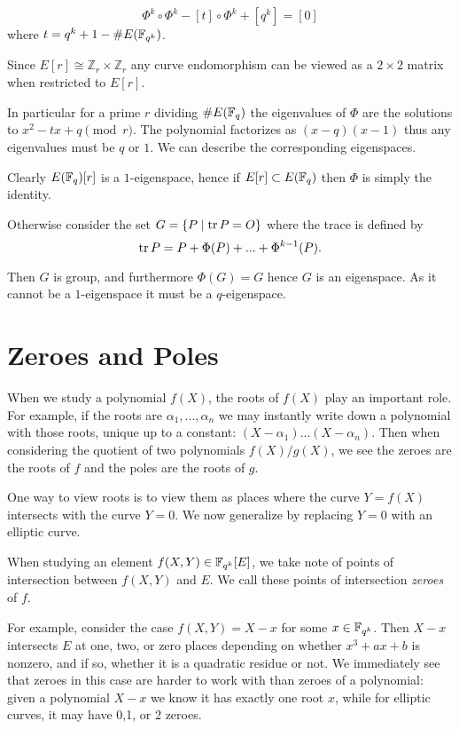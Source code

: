 \begin{theorem}
[Hasse]
\[ \Phi^k \circ \Phi^k - [t] \circ \Phi^k + [q^k] = [0] \]
where $t = q^k + 1 - \#E(\mathbb{F}_{q^k})$.
\end{theorem}

Since $E[r] \cong \mathbb{Z}_r \times \mathbb{Z}_r$ any curve endomorphism
can be viewed as a $2\times 2$ matrix when restricted to $E[r]$.

In particular for a prime $r$ dividing $\#E(\mathbb{F}_q)$ the eigenvalues
of $\Phi$ are the solutions to $x^2 - t x + q \pmod{r}$.
The polynomial factorizes as $(x - q)(x - 1)$ thus any eigenvalues
must be $q$ or $1$. We can describe the corresponding eigenspaces.

Clearly $E(\mathbb{F}_q)[r]$ is a $1$-eigenspace, hence if $E[r] \subset E(\mathbb{F}_q)$
then $\Phi$ is simply the identity.

Otherwise consider the set $G = \{P \mid \mathop{\rm tr} P = O \}$
where the trace is defined by
\[ \mathop{\rm tr} P = P + \Phi(P) + ... + \Phi^{k-1}(P)  .\]

Then $G$ is group, and furthermore $\Phi(G) = G$ hence $G$ is an eigenspace.
As it cannot be a $1$-eigenspace it must be a $q$-eigenspace.

\section {Zeroes and Poles}

When we study a polynomial $f(X)$, the roots of $f(X)$ play an important
role. For example, if the roots are $\alpha_1,...,\alpha_n$ we may
instantly write down a polynomial with those roots, unique up to a constant:
$(X-\alpha_1)...(X-\alpha_n)$. Then when considering the quotient of
two polynomials $f(X)/g(X)$, we see the zeroes are the roots of $f$ and
the poles are the roots of $g$.

One way to view roots is to view them as places where the curve $Y = f(X)$
intersects with the curve $Y = 0$. We now generalize by replacing $Y=0$
with an elliptic curve.

When studying an element $f(X,Y) \in \mathbb{F}_{q^k}[E]$, we take note of points of
intersection between $f(X,Y)$ and $E$.
We call these points of intersection \emph{zeroes} of $f$.

For example, consider the case $f(X,Y) = X-x$ for some $x\in\mathbb{F}_{q^k}$.
Then $X-x$ intersects $E$ at one, two, or zero places depending
on whether $x^3 + a x + b$ is nonzero, and if so, whether it is a quadratic
residue or not.
We immediately see that zeroes in this case are harder to work with than
zeroes of a polynomial: given a polynomial $X - x$ we know it has
exactly one root $x$, while for elliptic curves, it may have 0,1, or 2
zeroes.


